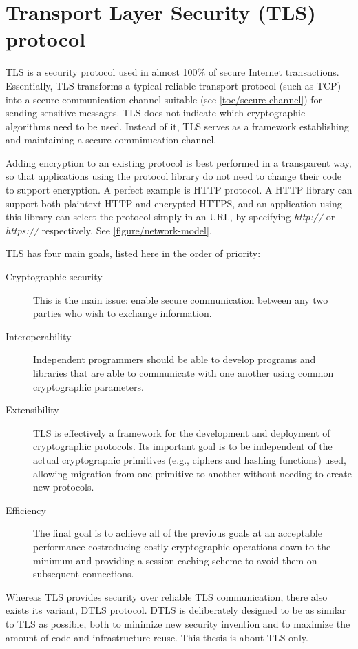 \chapter{Transport Layer Security (TLS) protocol}



TLS is a security protocol used in almost 100\% of secure Internet transactions. Essentially, TLS transforms a typical reliable transport protocol (such as TCP) into a secure communication channel suitable (see \autoref{toc/secure-channel}) for sending sensitive messages. TLS does not indicate which cryptographic algorithms need to be used. Instead of it, TLS serves as a framework establishing and maintaining a secure comminucation channel.

Adding encryption to an existing protocol is best performed in a transparent way, so that applications using the protocol library do not need to change their code to support encryption. A perfect example is HTTP protocol. A HTTP library can support both plaintext HTTP and encrypted HTTPS, and an application using this library can select the protocol simply in an URL, by specifying \textit{http://} or \textit{https://} respectively. See \autoref{figure/network-model}.

TLS has four main goals, listed here in the order of priority:

\begin{description}
  \item[Cryptographic security] This is the main issue: enable secure communication between any two parties who wish to exchange information.
  \item[Interoperability] Independent programmers should be able to develop programs and libraries that are able to communicate with one another using common cryptographic parameters.
  \item[Extensibility] TLS is effectively a framework for the development and deployment of cryptographic protocols. Its important goal is to be independent of the actual cryptographic primitives (e.g., ciphers and hashing functions) used, allowing migration from one primitive to another without needing to create new protocols.
  \item[Efficiency] The final goal is to achieve all of the previous goals at an acceptable performance costreducing costly cryptographic operations down to the minimum and providing a session caching scheme to avoid them on subsequent connections. \cite{ristic2014bulletproof}
\end{description}

Whereas TLS provides security over reliable TLS communication, there also exists its variant, DTLS protocol. DTLS is deliberately designed to be as similar to TLS as possible, both to minimize new security invention and to maximize the amount of code and infrastructure reuse. \cite{rfc6347} This thesis is about TLS only.






